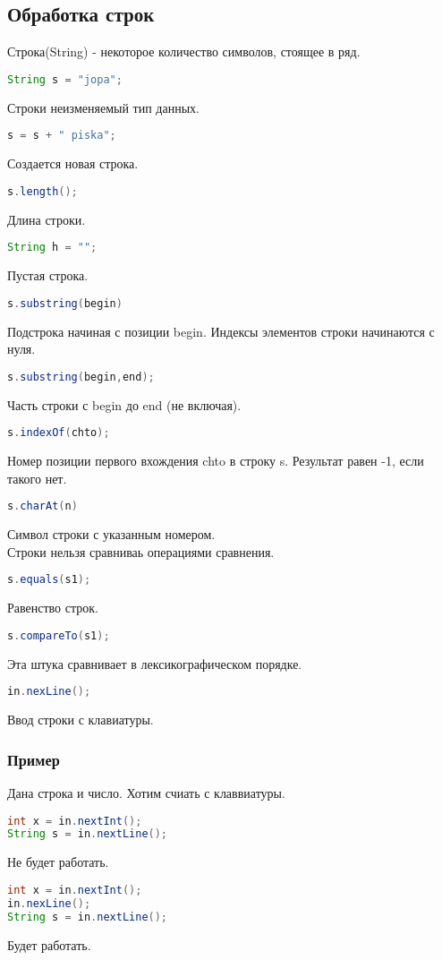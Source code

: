 \documentclass{article}
\begin{document}
\subsection{Обработка строк}
Строка(String) - некоторое количество символов, стоящее в ряд.
\begin{lstlisting}[language=Java] 
String s = "jopa";
\end{lstlisting} 
Строки неизменяемый тип данных.
\begin{lstlisting}[language=Java] 
s = s + " piska";
\end{lstlisting} 
Создается новая строка.
\begin{lstlisting}[language=Java] 
s.length();
\end{lstlisting} 
Длина строки.
\begin{lstlisting}[language=Java] 
String h = "";
\end{lstlisting} 
Пустая строка.
\begin{lstlisting}[language=Java] 
s.substring(begin) 
\end{lstlisting} 
Подстрока начиная с позиции begin. Индексы элементов строки начинаются с нуля.
\begin{lstlisting}[language=Java] 
s.substring(begin,end);
\end{lstlisting} 
Часть строки с begin до end (не включая).
\begin{lstlisting}[language=Java] 
s.indexOf(chto);
\end{lstlisting} 
Номер позиции первого вхождения chto в строку s. Результат равен -1, если такого нет.
\begin{lstlisting}[language=Java] 
s.charAt(n) 
\end{lstlisting} 
Символ строки с указанным номером.\\
Строки нельзя сравниваь операциями сравнения.
\begin{lstlisting}[language=Java] 
s.equals(s1);
\end{lstlisting} 
Равенство строк.
\begin{lstlisting}[language=Java] 
s.compareTo(s1);
\end{lstlisting} 
Эта штука сравнивает в лексикографическом порядке.
\begin{lstlisting}[language=Java] 
in.nexLine();
\end{lstlisting} 
Ввод строки с клавиатуры.
\subsubsection{Пример}
Дана строка и число. Хотим счиать с клаввиатуры.
\begin{lstlisting}[language=Java] 
int x = in.nextInt();
String s = in.nextLine();
\end{lstlisting} 
Не будет работать.
\begin{lstlisting}[language=Java] 
int x = in.nextInt();
in.nexLine();
String s = in.nextLine();
\end{lstlisting} 
Будет работать.
\end{document}
